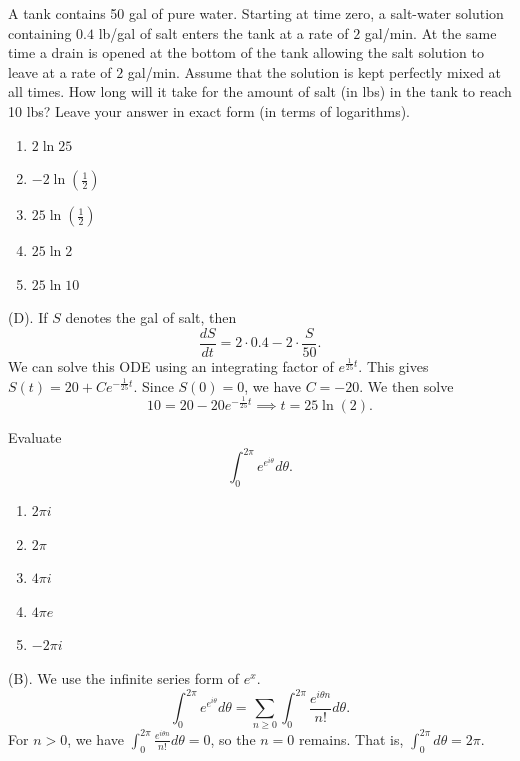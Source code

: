 \begin{exercise}
A tank contains 50 gal of pure water. Starting at time zero, a salt-water solution containing
$0.4$ lb/gal of salt enters the tank at a rate of $2$ gal/min. At the same time a drain is
opened at the bottom of the tank allowing the salt solution to leave at a rate of $2$ gal/min.
Assume that the solution is kept perfectly mixed at all times. How long will it take for the amount
of salt (in lbs) in the tank to reach 10 lbs? Leave your answer in exact form (in terms of logarithms).
\begin{enumerate}[label=(\Alph*)]
    \item $2\ln 25$
    \item $-2\ln\left(\frac{1}{2}\right)$
    \item $25\ln\left(\frac{1}{2}\right)$
    \item $25\ln 2$
    \item $25\ln 10$
\end{enumerate}
\end{exercise}
\begin{solution}
(D). If $S$ denotes the gal of salt, then 
\[
\frac{dS}{dt} = 2 \cdot 0.4 - 2 \cdot \frac{S}{50}.
\]
We can solve this ODE using an integrating factor of $e^{\frac{1}{25}t}$.
This gives $S(t) = 20 + Ce^{-\frac{1}{25}t}$. Since $S(0) = 0$, we have $C = -20$.
We then solve 
\[
10 = 20 -20e^{-\frac{1}{25}t} \implies t = 25 \ln(2).
\]
\end{solution}

\begin{exercise}
Evaluate
\[
\int_0^{2\pi} e^{e^{i\theta}} d\theta.
\]
\begin{enumerate}[label=(\Alph*)]
    \item $2\pi i$
    \item $2\pi$
    \item $4\pi i$
    \item $4\pi e$
    \item $-2\pi i$
\end{enumerate}
\end{exercise}
\begin{solution}
(B). We use the infinite series form of $e^x$.
\[
\int_0^{2\pi} e^{e^{i\theta}} d\theta 
= \sum_{n \geq 0} \int_0^{2\pi} \frac{e^{i\theta n}}{n!} d\theta.
\]
For $n > 0$, we have $\int_0^{2\pi} \frac{e^{i\theta n}}{n!} d\theta = 0$, so the $n = 0$
remains. That is, $\int_0^{2\pi} d\theta = 2\pi$.
\end{solution}

